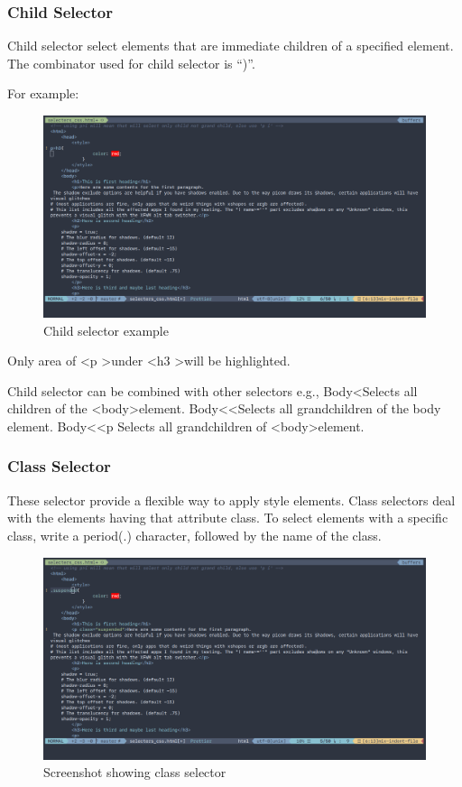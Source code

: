 \documentclass[a4paper,1pt,oneside]{article}
\begin{document}
\subsubsection{Child Selector}

Child selector select elements that are immediate children of a specified element. The combinator used for child selector is ``)''.

For example:

\begin{figure}[hbt!]
	\centering
	\includegraphics[width=1\textwidth]{images/2020-03-23-225605_1302x688_scrot.png}
	\caption{Child selector example}
\end{figure}

Only area of \textless p \textgreater under \textless h3 \textgreater will be highlighted.

Child selector can be combined with other selectors e.g.,
Body\textless* Selects all children of the \textless{}body\textgreater element.
Body\textless*\textless* Selects all grandchildren of the body element.
Body\textless*\textless{}p Selects all grandchildren of \textless{}body\textgreater element.

\subsubsection{Class Selector}

These selector provide a flexible way to apply style elements. Class selectors deal with the elements having that attribute class. To select elements with a specific class, write a period(.) character, followed by the name of the class.

\begin{figure}[hbt!]
	\centering
	\includegraphics[width=1\textwidth]{images/2020-03-23-230041_1302x688_scrot.png}
	\caption{Screenshot showing class selector}
\end{figure}
\end{document}
